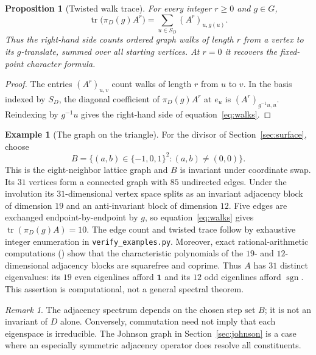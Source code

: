 \documentclass[12pt,letterpaper]{article}
\newtheorem{proposition}[theorem]{Proposition}
\theoremstyle{definition}
\newtheorem{example}[theorem]{Example}
\theoremstyle{remark}
\newtheorem{remark}[theorem]{Remark}
\numberwithin{equation}{section}
\DeclareMathOperator{\tr}{tr}
\newcommand{\bfone}{\mathbf 1}
\begin{document}
\begin{proposition}[Twisted walk trace]\label{prop:walks}
For every integer $r\geq0$ and $g\in G$,
\begin{equation}\label{eq:walks}
\tr\bigl(\pi_D(g)A^r\bigr)=
\sum_{u\in S_D}(A^r)_{u,g(u)}.
\end{equation}
Thus the right-hand side counts ordered graph walks of length $r$ from a vertex to its $g$-translate, summed over all starting vertices. At $r=0$ it recovers the fixed-point character formula.
\end{proposition}
\begin{proof}
The entries $(A^r)_{u,v}$ count walks of length $r$ from $u$ to $v$. In the basis indexed by $S_D$, the diagonal coefficient of $\pi_D(g)A^r$ at $e_u$ is $(A^r)_{g^{-1}u,u}$. Reindexing by $g^{-1}u$ gives the right-hand side of equation~\eqref{eq:walks}.
\end{proof}

\begin{example}[The graph on the triangle]\label{ex:graph31}
For the divisor of Section~\ref{sec:surface}, choose
\[
B=\{(a,b)\in\{-1,0,1\}^2:(a,b)\ne(0,0)\}.
\]
This is the eight-neighbor lattice graph and $B$ is invariant under coordinate swap. Its $31$ vertices form a connected graph with $85$ undirected edges. Under the involution its $31$-dimensional vertex space splits as an invariant adjacency block of dimension $19$ and an anti-invariant block of dimension $12$. Five edges are exchanged endpoint-by-endpoint by $g$, so equation~\eqref{eq:walks} gives $\tr(\pi_D(g)A)=10$. The edge count and twisted trace follow by exhaustive integer enumeration in \texttt{verify\_examples.py}. Moreover, exact rational-arithmetic computations () show that the characteristic polynomials of the $19$- and $12$-dimensional adjacency blocks are squarefree and coprime. Thus $A$ has $31$ distinct eigenvalues: its $19$ even eigenlines afford $\bfone$ and its $12$ odd eigenlines afford $\operatorname{sgn}$. This assertion is computational, not a general spectral theorem.
\end{example}

\begin{remark}
The adjacency spectrum depends on the chosen step set $B$; it is not an invariant of $D$ alone. Conversely, commutation need not imply that each eigenspace is irreducible. The Johnson graph in Section~\ref{sec:johnson} is a case where an especially symmetric adjacency operator does resolve all constituents.
\end{remark}
\end{document}
